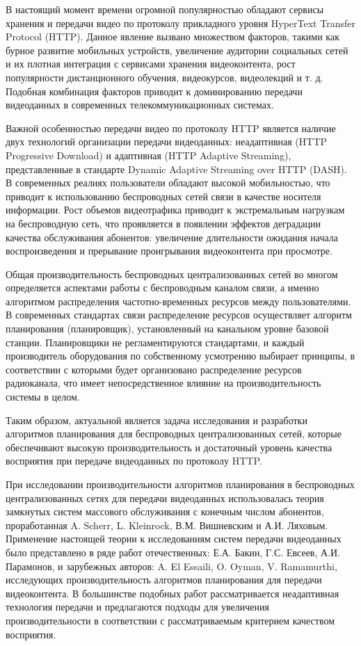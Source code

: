 {\actuality}
В настоящий момент времени огромной популярностью обладают сервисы хранения и передачи видео по протоколу прикладного уровня HyperText Transfer Protocol (HTTP). Данное явление вызвано множеством факторов, такими как бурное развитие мобильных устройств, увеличение аудитории социальных сетей и их плотная интеграция с сервисами хранения видеоконтента, рост популярности дистанционного обучения, видеокурсов, видеолекций и т. д. Подобная комбинация факторов приводит к доминированию передачи видеоданных в современных телекоммуникационных системах.

Важной особенностью передачи видео по протоколу HTTP является наличие двух технологий организации передачи видеоданных: неадаптивная (HTTP Progressive Download) и адаптивная (HTTP Adaptive Streaming), представленные в стандарте Dynamic Adaptive Streaming over HTTP (DASH). В современных реалиях пользователи обладают высокой мобильностью, что приводит к использованию беспроводных сетей связи в качестве носителя информации. Рост объемов видеотрафика приводит к экстремальным нагрузкам на беспроводную сеть, что проявляется в появлении эффектов деградации качества обслуживания абонентов: увеличение длительности ожидания начала воспроизведения и прерывание проигрывания видеоконтента при просмотре.

Общая производительность беспроводных централизованных сетей во многом определяется аспектами работы с беспроводным каналом связи, а именно алгоритмом распределения частотно-временных ресурсов между пользователями. В современных стандартах связи распределение ресурсов осуществляет алгоритм планирования (планировщик), установленный на канальном уровне базовой станции. Планировщики не регламентируются стандартами, и каждый производитель оборудования по собственному усмотрению выбирает принципы, в соответствии с которыми будет организовано распределение ресурсов радиоканала, что имеет непосредственное влияние на производительность системы в целом.

Таким образом, актуальной является задача исследования и разработки алгоритмов планирования для беспроводных централизованных сетей, которые обеспечивают высокую производительность и достаточный уровень качества восприятия при передаче видеоданных по протоколу HTTP.

При исследовании производительности алгоритмов планирования в беспроводных централизованных сетях для передачи видеоданных использовалась теория замкнутых систем массового обслуживания с конечным числом абонентов, проработанная A. Scherr, L. Kleinrock, В.М. Вишневским и А.И. Ляховым. Применение настоящей теории к исследованиям систем передачи видеоданных было представлено в ряде работ отечественных: Е.А. Бакин, Г.С. Евсеев, А.И. Парамонов, и зарубежных авторов: A. El Essaili, O. Oyman, V. Ramamurthi, исследующих производительность алгоритмов планирования для передачи видеоконтента. В большинстве подобных работ рассматривается неадаптивная технология передачи и предлагаются подходы для увеличения производительности в соответствии с рассматриваемым критерием качеством восприятия.


